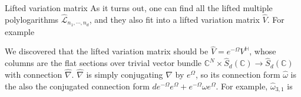 \documentclass[8pt]{beamer}
\theoremstyle{definition}
\theoremstyle{remark}
\begin{document}
\begin{frame}[t]{Lifted variation matrix}
As it turns out, one can find all the lifted multiple polylogarithms $\widehat{\mathcal L}_{n_1,\cdots,n_d}$, and they also fit into a lifted variation matrix $\widehat V$. For example
\begin{center}
\end{center}
We discovered that the lifted variation matrix should be $\widehat V=e^{-\Omega}V^{\mathbb H}$, whose columns are the flat sections over trivial vector bundle $\mathbb C^N\times \widehat S_d(\mathbb C)\to \widehat S_d(\mathbb C)$ with connection $\widehat\nabla$. $\widehat\nabla$ is simply conjugating $\nabla$ by $e^\Omega$, so its connection form $\widehat{\omega}$ is the also the conjugated connection form $d e^{-\Omega}e^\Omega+e^{-\Omega}\omega e^\Omega$. For example, $\widehat{\omega}_{3,1}$ is
\begin{center}
\end{center}
\end{frame}
\end{document}
